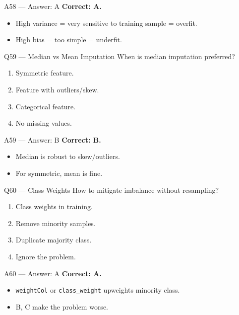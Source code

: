 \documentclass[aspectratio=169,10pt]{beamer}
\begin{document}
	\begin{frame}{A58 — Answer: A}
		\textbf{Correct: A.}
		\begin{itemize}
			\item High variance = very sensitive to training sample = overfit.
			\item High bias = too simple = underfit.
		\end{itemize}
	\end{frame}
	
	\begin{frame}{Q59 — Median vs Mean Imputation}
		When is median imputation preferred?
		\begin{enumerate}[label=\Alph*.]
			\item Symmetric feature.
			\item Feature with outliers/skew.
			\item Categorical feature.
			\item No missing values.
		\end{enumerate}
	\end{frame}
	
	\begin{frame}{A59 — Answer: B}
		\textbf{Correct: B.}
		\begin{itemize}
			\item Median is robust to skew/outliers.
			\item For symmetric, mean is fine.
		\end{itemize}
	\end{frame}
	
	\begin{frame}{Q60 — Class Weights}
		How to mitigate imbalance without resampling?
		\begin{enumerate}[label=\Alph*.]
			\item Class weights in training.
			\item Remove minority samples.
			\item Duplicate majority class.
			\item Ignore the problem.
		\end{enumerate}
	\end{frame}
	
	\begin{frame}{A60 — Answer: A}
		\textbf{Correct: A.}
		\begin{itemize}
			\item \texttt{weightCol} or \texttt{class\_weight} upweights minority class.
			\item B, C make the problem worse.
		\end{itemize}
	\end{frame}
	
\end{document}
